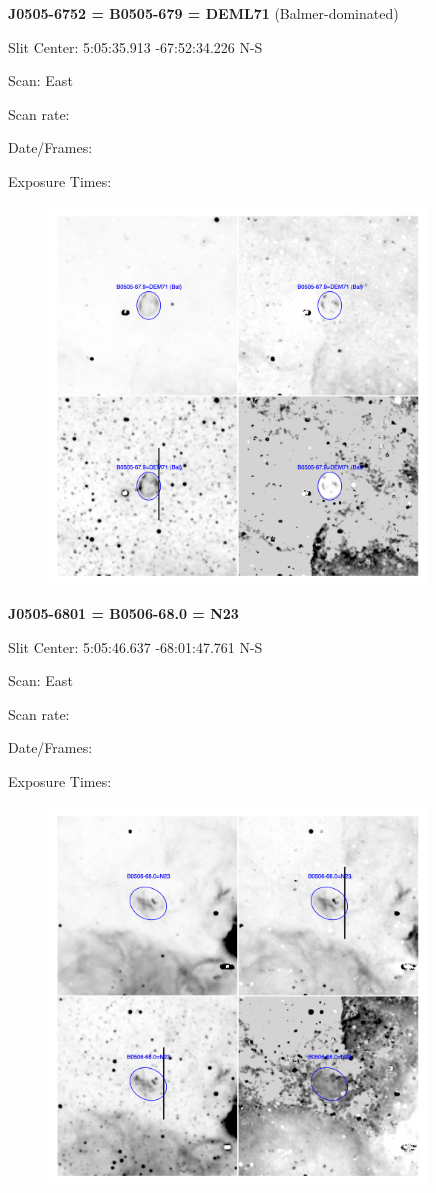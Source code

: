\documentclass[11pt]{article}
\begin{document}
\newpage
{\bf J0505-6752 = B0505-679 = DEML71}  (Balmer-dominated)

Slit Center:   5:05:35.913    -67:52:34.226     N-S

Scan:  East

Scan rate:  

Date/Frames:

Exposure Times:  

\begin{figure}
\includegraphics[width=10.05cm]{snapshots/B0505-679.png}
\end{figure}

\newpage
{\bf J0505-6801 = B0506-68.0 = N23}  
 
Slit Center:   5:05:46.637    -68:01:47.761     N-S

Scan:  East

Scan rate:  

Date/Frames:

Exposure Times:  

\begin{figure}
\includegraphics[width=10.05cm]{snapshots/B0506-680.png}
\end{figure}
\end{document}

